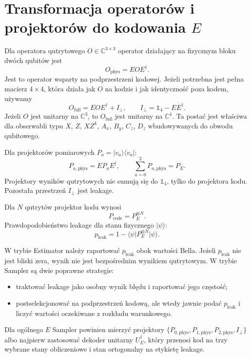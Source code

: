 \documentclass[12pt]{article}
\newcommand{\ket}[1]{\lvert #1\rangle}
\newcommand{\bra}[1]{\langle #1\rvert}
\newcommand{\id}{\mathbb{1}}
\begin{document}
\section{Transformacja operator\'ow i projektor\'ow do kodowania $E$}

Dla operatora qutrytowego $O\in\mathbb{C}^{3\times 3}$ operator dzia\l{}aj\k{a}cy na
fizycznym bloku dw\'och qubit\'ow jest
\begin{equation}
    O_{\mathrm{phys}}=E O E^\dagger.
\end{equation}
Jest to operator wsparty na podprzestrzeni kodowej. Je\.zeli potrzebna jest pe\l{}na macierz
$4\times4$, kt\'ora dzia\l{}a jak $O$ na kodzie i jak identyczno\'s\'c poza kodem, u\.zywamy
\begin{equation}
    O_{\mathrm{full}}=E O E^\dagger+I_\perp,
    \qquad
    I_\perp=\id_4-EE^\dagger.
\end{equation}
Je\.zeli $O$ jest unitarny na $\mathbb{C}^3$, to $O_{\mathrm{full}}$ jest unitarny na
$\mathbb{C}^4$. Ta posta\'c jest w\l{}a\'sciwa dla obserwabli typu $X$, $Z$, $XZ^k$,
$A_x$, $B_y$, $C_z$, $D_z$ wbudowywanych do obwodu qubitowego.

Dla projektor\'ow pomiarowych $P_a=\ket{v_a}\bra{v_a}$:
\begin{equation}
    P_{a,\mathrm{phys}}=E P_a E^\dagger,
    \qquad
    \sum_{a=0}^{2}P_{a,\mathrm{phys}}=P_E.
\end{equation}
Projektory wynik\'ow qutrytowych nie sumuj\k{a} si\k{e} do $\id_4$, tylko do projektora kodu.
Pozosta\l{}a przestrze\'n $I_\perp$ jest leakage.

Dla $N$ qutryt\'ow projektor kodu wynosi
\begin{equation}
    P_{\mathrm{code}}=P_E^{\otimes N}.
\end{equation}
Prawdopodobie\'nstwo leakage dla stanu fizycznego $\ket{\psi}$:
\begin{equation}
    p_{\mathrm{leak}}
    =
    1-\bra{\psi}P_E^{\otimes N}\ket{\psi}.
\end{equation}

W trybie Estimator nale\.zy raportowa\'c $p_{\mathrm{leak}}$ obok warto\'sci Bella. Je\.zeli
$p_{\mathrm{leak}}$ nie jest bliski zera, wynik nie jest bezpo\'srednim wynikiem qutrytowym.
W trybie Sampler s\k{a} dwie poprawne strategie:
\begin{itemize}
    \item traktowa\'c leakage jako osobny wynik b\l{}\k{e}du i raportowa\'c jego cz\k{e}sto\'s\'c;
    \item postselekcjonowa\'c na podprzestrze\'n kodow\k{a}, ale wtedy jawnie poda\'c
    $p_{\mathrm{leak}}$ i liczy\'c warto\'sci oczekiwane z rozk\l{}adu warunkowego.
\end{itemize}
Dla og\'olnego $E$ Sampler powinien mierzy\'c projektory
$\{P_{0,\mathrm{phys}},P_{1,\mathrm{phys}},P_{2,\mathrm{phys}},I_\perp\}$ albo najpierw
zastosowa\'c dekoder unitarny $U_E^\dagger$, kt\'ory przenosi kod na trzy wybrane stany
obliczeniowe i stan ortogonalny na etykiet\k{e} leakage.
\end{document}
